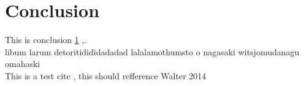 \section{Conclusion}\label{Sec:Conclusion}
This is conclusion \ref{Sec:Conclusion} ,.\\
libum larum detoritidididadadad lalalamothumsto o nagasaki witsjomudanagu omahaski \\
This is a test cite \cite{Walter:2014}, this should refference Walter 2014